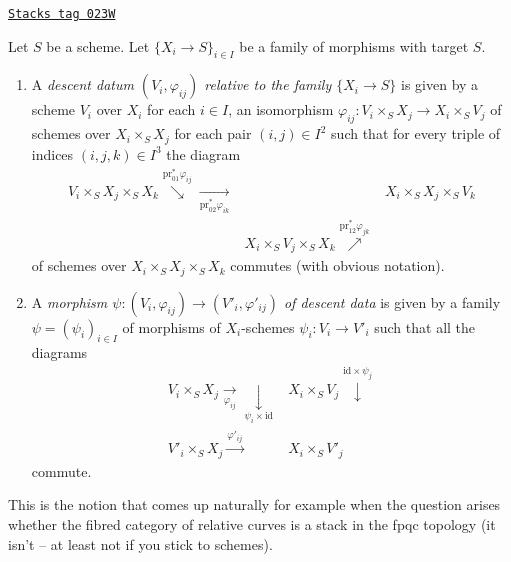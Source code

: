 \begin{definition}
\label{descent-definition-descent-datum-for-family-of-morphisms}
\href{https://stacks.math.columbia.edu/tag/023W}{\texttt{Stacks tag 023W}}

Let $S$ be a scheme.
Let $\{X_i \to S\}_{i \in I}$ be a family of morphisms with target $S$.
\begin{enumerate}
\item A {\it descent datum $(V_i, \varphi_{ij})$ relative to the
family $\{X_i \to S\}$} is given by a scheme $V_i$ over $X_i$
for each $i \in I$, an isomorphism
$\varphi_{ij} : V_i \times_S X_j \to X_i \times_S V_j$
of schemes over $X_i \times_S X_j$ for each pair $(i, j) \in I^2$
such that for every triple of indices $(i, j, k) \in I^3$
the diagram
$$
\begin{array}{ccc}V_i \times_S X_j \times_S X_k
\overset{\text{pr}_{01}^*\varphi_{ij}}{\searrow}\underset{\text{pr}_{02}^*\varphi_{ik}}{\longrightarrow} &  & X_i \times_S X_j \times_S V_k \\  & X_i \times_S V_j \times_S X_k
\overset{\text{pr}_{12}^*\varphi_{jk}}{\nearrow} & \end{array}
$$
of schemes over $X_i \times_S X_j \times_S X_k$ commutes
(with obvious notation).
\item A {\it morphism
$\psi : (V_i, \varphi_{ij}) \to (V'_i, \varphi'_{ij})$
of descent data} is given by a family
$\psi = (\psi_i)_{i \in I}$ of morphisms of
$X_i$-schemes $\psi_i : V_i \to V'_i$ such that all the diagrams
$$
\begin{array}{cc}V_i \times_S X_j \underset{\varphi_{ij}}{\longrightarrow}\underset{\psi_i \times \text{id}}{\downarrow} & X_i \times_S V_j \overset{\text{id} \times \psi_j}{\downarrow} \\ V'_i \times_S X_j \overset{\varphi'_{ij}}{\longrightarrow} & X_i \times_S V'_j\end{array}
$$
commute.
\end{enumerate}
\end{definition}

This is the notion that comes up naturally for example when the question arises
whether the fibred category of relative curves is a stack in the
fpqc topology (it isn't -- at least not if you stick to schemes).

